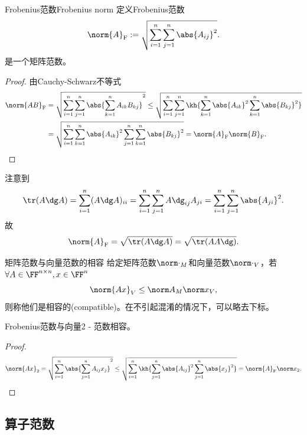 \newcommand{\Forb}[1]{\norm{#1}_{\mathrm F}}


\begin{example}
    {Frobenius范数}{Frobenius norm}
    定义Frobenius范数
    \begin{equation}
        \Forb A:=\sqrt{\sum_{i=1}^n\sum_{j=1}^n\abs{A_{ij}}^2}.
    \end{equation}
    是一个矩阵范数。
    \begin{proof}
        由Cauchy-Schwarz不等式
        \begin{align*}
            \Forb{AB}&=\sqrt{\sum_{i=1}^n\sum_{j=1}^n\abs{\sum_{k=1}^nA_{ik}B_{kj}}^2}\leq\sqrt{\sum_{i=1}^n\sum_{j=1}^n\kh{\sum_{k=1}^n\abs{A_{ik}}^2\sum_{k=1}^n\abs{B_{kj}}^2}}\\
            &=\sqrt{\sum_{i=1}^n\sum_{k=1}^n\abs{A_{ik}}^2\sum_{j=1}^n\sum_{k=1}^n\abs{B_{kj}}^2}=\Forb A\Forb B.
            \qedhere
        \end{align*}
    \end{proof}
    \tcblower
    注意到
    \[
        \tr(A\dg A)=\sum_{i=1}^n(A\dg A)_{ii}=\sum_{i=1}^n\sum_{j=1}^nA\dg_{ij}A_{ji}=\sum_{i=1}^n\sum_{j=1}^n\abs{A_{ji}}^2.
    \]
    故
    \begin{equation}
        \Forb A=\sqrt{\tr(A\dg A)}=\sqrt{\tr(AA\dg)}.
    \end{equation}
\end{example}

\begin{definition}
    {矩阵范数与向量范数的相容}{}
    给定矩阵范数$\norm\cdot_M$和向量范数$\norm\cdot_V$，若$\forall A\in\FF^{n\times n},x\in\FF^n$ 
    \begin{equation}
        \norm{Ax}_V\leq\norm A_M\norm x_V,
    \end{equation}
    则称他们是相容的(compatible)。在不引起混淆的情况下，可以略去下标。
\end{definition}

\begin{theorem}
    {}{}
    Frobenius范数与向量2 - 范数相容。
\end{theorem}

\begin{proof}
    \[
        \norm{Ax}_2=\sqrt{\sum_{i=1}^n\abs{\sum_{j=1}^n A_{ij}x_j}^2}\leq\sqrt{\sum_{i=1}^n\kh{\sum_{j=1}^n\abs{A_{ij}}^2\sum_{j=1}^n\abs{x_j}^2}}=\Forb A\norm x_2.
        \qedhere
    \]
\end{proof}

\subsection{算子范数}

